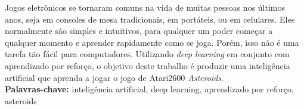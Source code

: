 Jogos eletrônicos se tornaram comuns na vida de muitas pessoas nos últimos anos, seja em consoles de mesa tradicionais, em portáteis, ou em celulares.
Eles normalmente são simples e intuitivos, para qualquer um poder começar a qualquer momento e aprender rapidamente como se joga.
Porém, isso não é uma tarefa tão fácil para computadores.
Utilizando \textit{deep learning} em conjunto com aprendizado por reforço, o objetivo deste trabalho é produzir uma inteligência artificial que aprenda a jogar o jogo de Atari2600 \textit{Asteroids}.
\\

\noindent%
\textbf{Palavras-chave:} inteligência artificial, deep learning, aprendizado por reforço, asteroids

%
%
